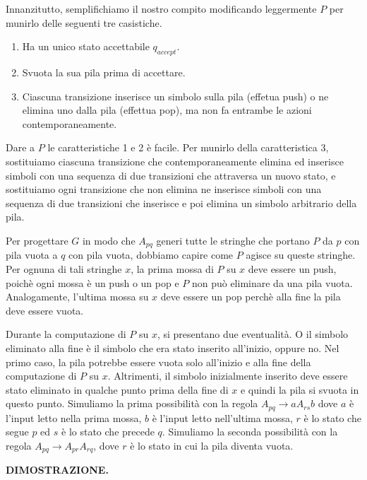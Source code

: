 \documentclass{article}
\begin{document}
Innanzitutto, semplifichiamo il nostro compito modificando leggermente $P$ per munirlo delle seguenti tre casistiche.

\begin{enumerate}
    \item Ha un unico stato accettabile $q_{accept}$.
    \item Svuota la sua pila prima di accettare.
    \item Ciascuna transizione inserisce un simbolo sulla pila (effetua push) o ne elimina uno dalla pila (effettua pop), ma non fa entrambe le azioni contemporaneamente.
\end{enumerate}

Dare a $P$ le caratteristiche 1 e 2 è facile.
Per munirlo della caratteristica 3, sostituiamo ciascuna transizione che contemporaneamente elimina ed inserisce simboli con una sequenza di due transizioni che attraversa un nuovo stato, e sostituiamo ogni transizione che non elimina ne inserisce simboli con una sequenza di due transizioni che inserisce e poi elimina un simbolo arbitrario della pila.

Per progettare $G$ in modo che $A_{pq}$ generi tutte le stringhe che portano $P$ da $p$ con pila vuota a $q$ con pila vuota, dobbiamo capire come $P$ agisce su queste stringhe.
Per ognuna di tali stringhe $x$, la prima mossa di $P$ su $x$ deve essere un push, poichè ogni mossa è un push o un pop e $P$ non può eliminare da una pila vuota.
Analogamente, l'ultima mossa su $x$ deve essere un pop perchè alla fine la pila deve essere vuota.

Durante la computazione di $P$ su $x$, si presentano due eventualità.
O il simbolo eliminato alla fine è il simbolo che era stato inserito all'inizio, oppure no.
Nel primo caso, la pila potrebbe essere vuota solo all'inizio e alla fine della computazione di $P$ su $x$.
Altrimenti, il simbolo inizialmente inserito deve essere stato eliminato in qualche punto prima della fine di $x$ e quindi la pila si svuota in questo punto.
Simuliamo la prima possibilità con la regola $A_{pq} \rightarrow aA_{rs}b$ dove $a$ è l'input letto nella prima mossa, $b$ è l'input letto nell'ultima mossa, $r$ è lo stato che segue $p$ ed $s$ è lo stato che precede $q$.
Simuliamo la seconda possibilità con la regola $A_{pq} \rightarrow A_{pr}A_{rq}$, dove $r$ è lo stato in cui la pila diventa vuota.
\vspace{1em}

\textbf{DIMOSTRAZIONE.}
\end{document}
